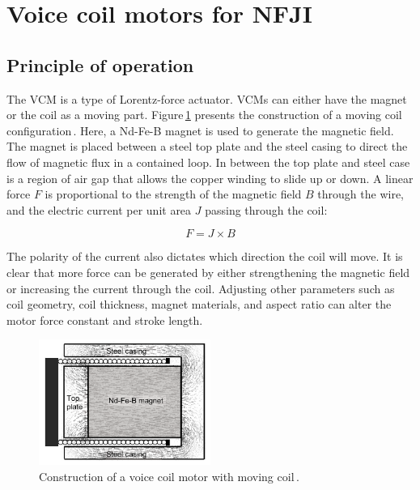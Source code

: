 \section{Voice coil motors for \acs{NFJI}}          \label{Chapter:background/voice coil motors for NFJI}
    
    
    \subsection{Principle of operation}             \label{Chapter:background/voice coil motors for NFJI/principle}


    The \ac{VCM} is a type of Lorentz-force actuator. \acsp{VCM} can either have the magnet or the coil as a moving part. Figure\,\ref{fig:chapter/background/vcm cut view} presents the construction of a moving coil configuration\,\cite{taberner2006}. Here, a Nd-Fe-B magnet is used to generate the magnetic field. The magnet is placed between a steel top plate and the steel casing to direct the flow of magnetic flux in a contained loop. In between the top plate and steel case is a region of air gap that allows the copper winding to slide up or down. A linear force $F$ is proportional to the strength of the magnetic field $B$ through the wire, and the electric current per unit area $J$ passing through the coil:
    
    
    \begin{equation}
        F=J\times B
        \label{eq:force produce via field and current}
    \end{equation}

    The polarity of the current also dictates which direction the coil will move. It is clear that more force can be generated by either strengthening the magnetic field or increasing the current through the coil. Adjusting other parameters such as coil geometry, coil thickness, magnet materials, and aspect ratio can alter the motor force constant and stroke length.
    
    
    \begin{figure}[!ht]
      \centering
      \includegraphics[width=0.5\textwidth]{chap2/images/vcm_cut_view.png}
      \caption[LoF entry]{Construction of a voice coil motor with moving coil\,\cite{taberner2006}.}
      \label{fig:chapter/background/vcm cut view}
    \end{figure}
    
